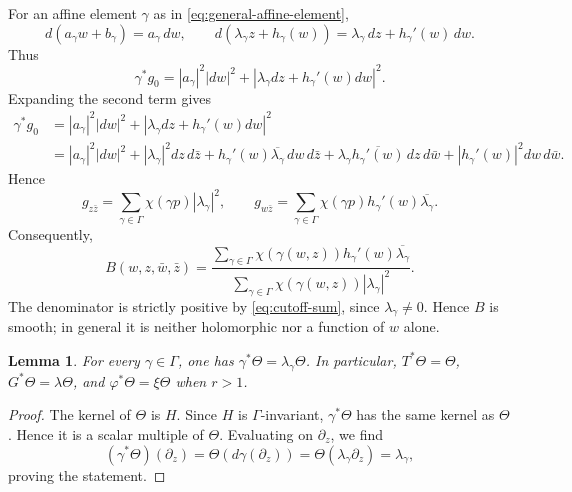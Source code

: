 \documentclass[12pt]{amsart}
\numberwithin{equation}{section}
\newtheorem{lema}{Lemma}
\theoremstyle{remark}
\theoremstyle{definition}
\begin{document}
For an affine element $\gamma$ as in \eqref{eq:general-affine-element},
\begin{equation*}
 d(a_\gamma w+b_\gamma)=a_\gamma\,dw,
 \qquad
 d(\lambda_\gamma z+h_\gamma(w))
 =
 \lambda_\gamma\,dz+h_\gamma'(w)\,dw.
\end{equation*}
Thus
$$
\gamma^*g_0=|a_\gamma|^2|dw|^2+|\lambda_\gamma dz+h_\gamma'(w)dw|^2.
$$
Expanding the second term gives
\begin{align*}
\gamma^* g_0 &=
|a_\gamma|^2|dw|^2 + |\lambda_\gamma dz+h_\gamma'(w)dw|^2 \\
&=
|a_\gamma|^2|dw|^2 + |\lambda_\gamma|^2 dz\,d\bar z
+h_\gamma'(w)\overline{\lambda_\gamma}\,dw\,d\bar z
+\lambda_\gamma\overline{h_\gamma'(w)}\,dz\,d\bar w
+|h_\gamma'(w)|^2dw\,d\bar w.
\end{align*}
Hence
\begin{equation*}
 g_{z\bar z}
 =
 \sum_{\gamma\in\Gamma}\chi(\gamma p)|\lambda_\gamma|^2,
 \qquad
 g_{w\bar z}
 =
 \sum_{\gamma\in\Gamma}\chi(\gamma p)h_\gamma'(w)\overline{\lambda_\gamma}.
\end{equation*}
Consequently,
\begin{equation*}
 B(w,z,\bar w,\bar z)
 =
 \frac{
 \displaystyle\sum_{\gamma\in\Gamma}
 \chi(\gamma(w,z))h_\gamma'(w)\overline{\lambda_\gamma}
 }{
 \displaystyle\sum_{\gamma\in\Gamma}
 \chi(\gamma(w,z))|\lambda_\gamma|^2
 }.
\end{equation*}
The denominator is strictly positive by \eqref{eq:cutoff-sum}, since $\lambda_\gamma\ne0$. Hence $B$ is smooth; in general it is neither holomorphic nor a function of $w$ alone.

\begin{lema} \label{lem:Theta-equivariant}
For every $\gamma\in\Gamma$, one has $\gamma^*\Theta=\lambda_\gamma\Theta$. In particular, $T^*\Theta=\Theta$, $G^*\Theta=\lambda\Theta$, and $\varphi^*\Theta=\xi\Theta$ when $r>1$.
\end{lema}

\begin{proof}
The kernel of $\Theta$ is $H$. Since $H$ is $\Gamma$-invariant,
$\gamma^*\Theta$ has the same kernel as $\Theta$. Hence it is a scalar
multiple of $\Theta$. Evaluating on $\partial_z$, we find
\begin{equation*}
 (\gamma^*\Theta)(\partial_z)
 =
 \Theta(d\gamma(\partial_z))
 =
 \Theta(\lambda_\gamma\partial_z)
 =
 \lambda_\gamma,
\end{equation*}
proving the statement.
\end{proof}
\end{document}
